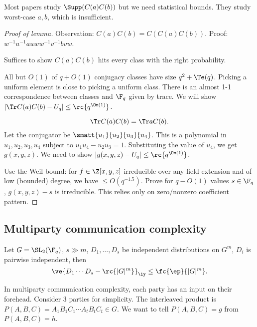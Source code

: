 Most papers study $\Supp(C(a)C(b))$ but we need statistical bounds. They study worst-case $a,b$, which is insufficient.
\begin{proof}[Proof of lemma]
Observation: $C(a)C(b)=C(C(a)C(b))$. Proof: $w^{-1}u^{-1}au ww^{-1} v^{-1}bvw$.

Suffices to show $C(a)C(b)$ hits every class with the right probability.

All but $O(1)$ of $q+O(1)$ conjugacy classes have size $q^2+\Te(q)$. Picking a uniform element is close to picking a uniform class. There is an almost 1-1 correspondence between classes and $\F_q$ given by trace. We will show $|\Tr C(a)C(b)-U_q|\le \rc{q^{\Om(1)}}$. 

\[
\Tr C(a)C(b)=\Tr a C(b).
\]
Let the conjugator be $\smatt{u_1}{u_2}{u_3}{u_4}$. This is a polynomial in $u_1,u_2,u_3,u_4$ subject to $u_1u_4-u_2u_3=1$. Substituting the value of $u_4$, we get $g(x,y,z)$. We need to show $|g(x,y,z)-U_q|\le \rc{q^{\Om(1)}}$.

Use the Weil bound: for $f\in \Z[x,y,z]$ irreducible over any field extension and of low (bounded) degree, we have $\le O(q^{-1.5})$. Prove for $q-O(1)$ values $s\in \F_q$, $g(x,y,z)-s$ is irreducible. This relies only on zero/nonzero coefficient pattern. 
\end{proof}

\subsection{Multiparty communication complexity}
\begin{lem}
Let $G=\SL_2(\F_q)$, $s\gg m$, $D_1,\ldots, D_s$ be independent distributions on $G^m$, $D_i$ is pairwise independent, then 
\[\ve{D_1\cdots D_s - \rc{|G|^m}}_{\iy}\le \fc{\ep}{|G|^m}.\]
\end{lem}

In multiparty communication complexity, each party has an input on their forehead. Consider 3 parties for simplicity. The interleaved product is $P(A,B,C) = A_1B_1C_1\cdots A_tB_tC_t\in G$. We want to tell $P(A,B,C)=g$ from $P(A,B,C)=h$.


